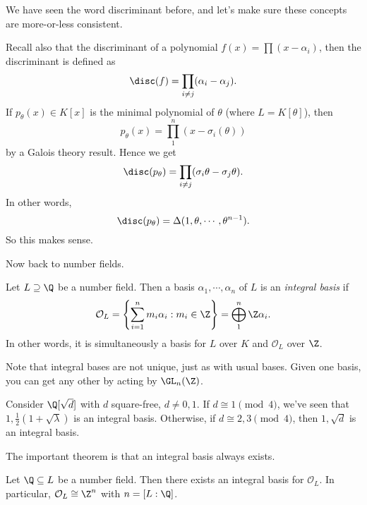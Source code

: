 \documentclass[a4paper]{article}
\begin{document}
We have seen the word discriminant before, and let's make sure these concepts are more-or-less consistent.

 Recall also that the discriminant of a polynomial $f(x) = \prod (x - \alpha_i)$, then the discriminant is defined as
\[
  \disc(f) = \prod_{i \not= j}(\alpha_i - \alpha_j).
\]
If $p_\theta(x) \in K[x]$ is the minimal polynomial of $\theta$ (where $L = K[\theta]$), then
\[
  p_\theta(x) = \prod_{1}^n (x - \sigma_i(\theta))
\]
by a Galois theory result. Hence we get
\[
  \disc(p_\theta) = \prod_{i \not= j}(\sigma_i \theta - \sigma_j \theta).
\]
In other words,
\[
  \disc(p_\theta) = \Delta(1, \theta, \cdots, \theta^{n - 1}).
\]
So this makes sense.

Now back to number fields.
\begin{defi}
  Let $L \supseteq \Q$ be a number field. Then a basis $\alpha_1, \cdots, \alpha_n$ of $L$ is an \emph{integral basis} if
  \[
    \mathcal{O}_L = \left\{\sum_{i = 1}^n m_i \alpha_i: m_i \in \Z\right\} = \bigoplus_1^n \Z\alpha_i.
  \]
  In other words, it is simultaneously a basis for $L$ over $K$ and $\mathcal{O}_L$ over $\Z$.
\end{defi}
Note that integral bases are not unique, just as with usual bases. Given one basis, you can get any other by acting by $\GL_n(\Z)$.

\begin{eg}
  Consider $\Q[\sqrt{d}]$ with $d$ square-free, $d \not= 0, 1$. If $d \cong 1\pmod 4$, we've seen that $1, \frac{1}{2}(1 + \sqrt{\lambda})$ is an integral basis. Otherwise, if $d \cong 2, 3 \pmod 4$, then $1, \sqrt{d}$ is an integral basis.
\end{eg}

The important theorem is that an integral basis always exists.

\begin{thm}
  Let $\Q \subseteq L$ be a number field. Then there exists an integral basis for $\mathcal{O}_L$. In particular, $\mathcal{O}_L \cong \Z^n$ with $n = [L:\Q]$.
\end{thm}
\end{document}
